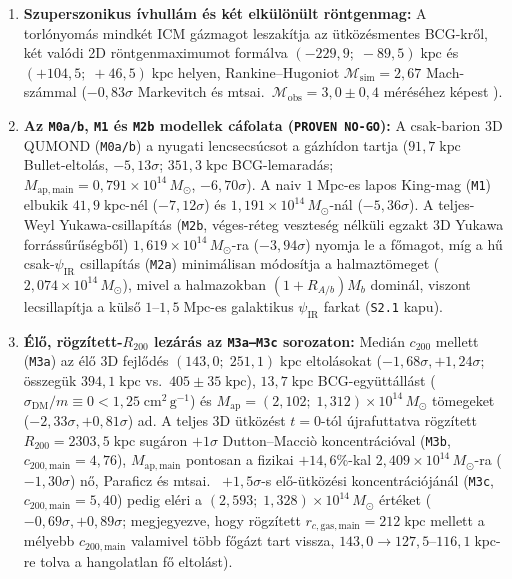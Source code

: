 \documentclass[11pt,a4paper]{article}
\begin{document}
\begin{enumerate}
    \item \textbf{Szuperszonikus ívhullám és két elkülönült röntgenmag:} A torlónyomás mindkét ICM gázmagot leszakítja az ütközésmentes BCG-kről, két valódi 2D röntgenmaximumot formálva $(-229{,}9;\; -89{,}5)\;\mathrm{kpc}$ és $(+104{,}5;\; +46{,}5)\;\mathrm{kpc}$ helyen, Rankine--Hugoniot $\mathcal{M}_{\mathrm{sim}} = 2{,}67$ Mach-számmal ($-0{,}83\sigma$ Markevitch és mtsai.\ $\mathcal{M}_{\mathrm{obs}} = 3{,}0 \pm 0{,}4$ méréséhez képest \cite{Markevitch2004}).
    \item \textbf{Az \texttt{M0a/b}, \texttt{M1} és \texttt{M2b} modellek cáfolata (\texttt{PROVEN NO-GO}):} A csak-barion 3D QUMOND (\texttt{M0a/b}) a nyugati lencsecsúcsot a gázhídon tartja ($91{,}7\;\mathrm{kpc}$ Bullet-eltolás, $-5{,}13\sigma$; $351{,}3\;\mathrm{kpc}$ BCG-lemaradás; $M_{\mathrm{ap,main}} = 0{,}791\times 10^{14}\,M_\odot$, $-6{,}70\sigma$). A naiv $1\;\mathrm{Mpc}$-es lapos King-mag (\texttt{M1}) elbukik $41{,}9\;\mathrm{kpc}$-nél ($-7{,}12\sigma$) és $1{,}191\times 10^{14}\,M_\odot$-nál ($-5{,}36\sigma$). A teljes-Weyl Yukawa-csillapítás (\texttt{M2b}, véges-réteg veszteség nélküli egzakt 3D Yukawa forrássűrűségből) $1{,}619\times 10^{14}\,M_\odot$-ra ($-3{,}94\sigma$) nyomja le a főmagot, míg a hű csak-$\psi_{\mathrm{IR}}$ csillapítás (\texttt{M2a}) minimálisan módosítja a halmaztömeget ($2{,}074\times 10^{14}\,M_\odot$), mivel a halmazokban $(1+R_{A/b})M_b$ dominál, viszont lecsillapítja a külső $1\text{--}1{,}5\;\mathrm{Mpc}$-es galaktikus $\psi_{\mathrm{IR}}$ farkat (\texttt{S2.1} kapu).
    \item \textbf{Élő, rögzített-$R_{200}$ lezárás az \texttt{M3a--M3c} sorozaton:} Medián $c_{200}$ mellett (\texttt{M3a}) az élő 3D fejlődés $(143{,}0;\; 251{,}1)\;\mathrm{kpc}$ eltolásokat ($-1{,}68\sigma, +1{,}24\sigma$; összegük $394{,}1\;\mathrm{kpc}$ vs.\ $405 \pm 35\;\mathrm{kpc}$), $13{,}7\;\mathrm{kpc}$ BCG-együttállást ($\sigma_{\mathrm{DM}}/m \equiv 0 < 1{,}25\;\mathrm{cm^2\,g^{-1}}$) és $M_{\mathrm{ap}} = (2{,}102;\; 1{,}312)\times 10^{14}\,M_\odot$ tömegeket ($-2{,}33\sigma, +0{,}81\sigma$) ad. A teljes 3D ütközést $t = 0$-tól újrafuttatva rögzített $R_{200} = 2303{,}5\;\mathrm{kpc}$ sugáron $+1\sigma$ Dutton--Macci\`o koncentrációval (\texttt{M3b}, $c_{200,\mathrm{main}} = 4{,}76$), $M_{\mathrm{ap,main}}$ pontosan a fizikai $+14{,}6\%$-kal $2{,}409\times 10^{14}\,M_\odot$-ra ($-1{,}30\sigma$) nő, Paraficz és mtsai.\ \cite{Paraficz2016} $+1{,}5\sigma$-s elő-ütközési koncentrációjánál (\texttt{M3c}, $c_{200,\mathrm{main}} = 5{,}40$) pedig eléri a $(2{,}593;\; 1{,}328)\times 10^{14}\,M_\odot$ értéket ($-0{,}69\sigma, +0{,}89\sigma$; megjegyezve, hogy rögzített $r_{c,\mathrm{gas,main}} = 212\;\mathrm{kpc}$ mellett a mélyebb $c_{200,\mathrm{main}}$ valamivel több főgázt tart vissza, $143{,}0 \to 127{,}5\text{--}116{,}1\;\mathrm{kpc}$-re tolva a hangolatlan fő eltolást).
\end{enumerate}
\end{document}
